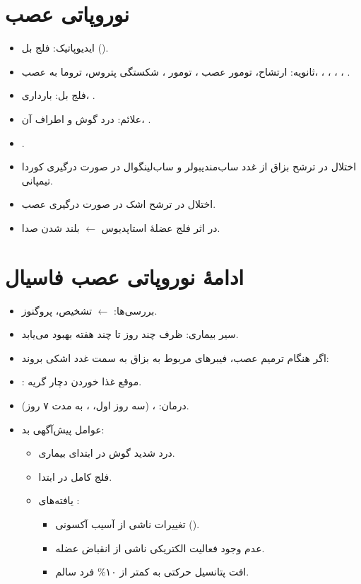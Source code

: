 \documentclass[a4paper,12pt]{extbook}
\begin{document}
\section*{نوروپاتی عصب }
\begin{itemize}
\item ایدیوپاتیک: فلج بل ().
\item ثانویه: ارتشاح، تومور عصب ، تومور ، شکستگی پتروس، تروما به عصب، ، ، ، ، .
\item {} فلج بل: بارداری، .
\item علائم: درد گوش و اطراف آن، .
\item {}.
\item اختلال در ترشح بزاق از غدد ساب‌مندیبولر و ساب‌لینگوال در صورت درگیری کوردا تیمپانی.
\item اختلال در ترشح اشک در صورت درگیری عصب.
\item {} در اثر فلج عضلهٔ استاپدیوس $\longleftarrow$ بلند شدن صدا.
\end{itemize}

\section*{ادامهٔ نوروپاتی عصب فاسیال}
\begin{itemize}
\item بررسی‌ها:  $\longleftarrow$ تشخیص، پروگنوز.
\item سیر بیماری: ظرف چند روز تا چند هفته بهبود می‌یابد.
\item اگر هنگام ترمیم عصب، فیبرهای مربوط به بزاق به سمت غدد اشکی بروند:
\item {}: موقع غذا خوردن دچار گریه.
\item درمان: ،  (سه روز اول، ، به مدت ۷ روز).
\item عوامل پیش‌آگهی بد:
\begin{itemize}
\item درد شدید گوش در ابتدای بیماری.
\item فلج کامل در ابتدا.
\item یافته‌های :
\begin{itemize}
\item تغییرات ناشی از آسیب آکسونی ().
\item عدم وجود فعالیت الکتریکی ناشی از انقباض عضله.
\item افت پتانسیل حرکتی به کمتر از ۱۰\% فرد سالم.
\end{itemize}
\end{itemize}
\end{itemize}
\end{document}
